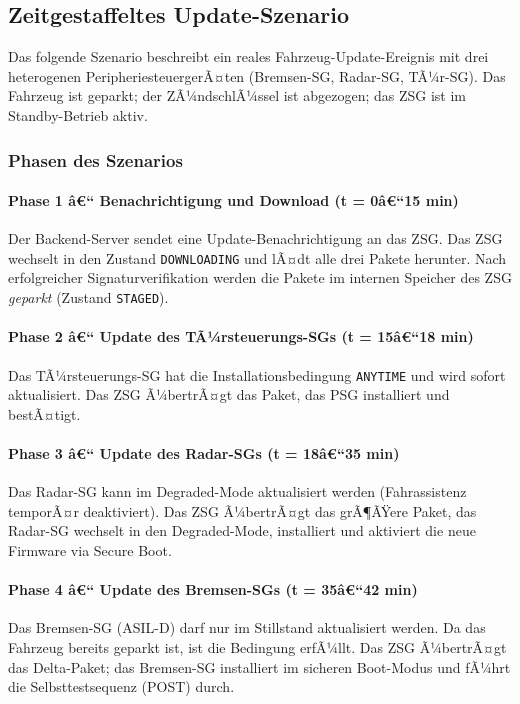 ﻿\documentclass[12pt,a4paper,twoside]{article}
\begin{document}
\subsection{Zeitgestaffeltes Update-Szenario}
\label{subsec:zeitgestaffelt}

Das folgende Szenario beschreibt ein reales Fahrzeug-Update-Ereignis mit
drei heterogenen PeripheriesteuergerÃ¤ten (Bremsen-SG, Radar-SG, TÃ¼r-SG).
Das Fahrzeug ist geparkt; der ZÃ¼ndschlÃ¼ssel ist abgezogen; das ZSG ist
im Standby-Betrieb aktiv.

\subsubsection{Phasen des Szenarios}

\paragraph{Phase 1 â€“ Benachrichtigung und Download (t = 0â€“15 min)}
Der Backend-Server sendet eine Update-Benachrichtigung an das ZSG.
Das ZSG wechselt in den Zustand \texttt{DOWNLOADING} und lÃ¤dt alle drei
Pakete herunter. Nach erfolgreicher Signaturverifikation werden die Pakete
im internen Speicher des ZSG \emph{geparkt} (Zustand \texttt{STAGED}).

\paragraph{Phase 2 â€“ Update des TÃ¼rsteuerungs-SGs (t = 15â€“18 min)}
Das TÃ¼rsteuerungs-SG hat die Installationsbedingung \texttt{ANYTIME}
und wird sofort aktualisiert. Das ZSG Ã¼bertrÃ¤gt das Paket, das PSG
installiert und bestÃ¤tigt.

\paragraph{Phase 3 â€“ Update des Radar-SGs (t = 18â€“35 min)}
Das Radar-SG kann im Degraded-Mode aktualisiert werden (Fahrassistenz
temporÃ¤r deaktiviert). Das ZSG Ã¼bertrÃ¤gt das grÃ¶ÃŸere Paket, das
Radar-SG wechselt in den Degraded-Mode, installiert und aktiviert die
neue Firmware via Secure Boot.

\paragraph{Phase 4 â€“ Update des Bremsen-SGs (t = 35â€“42 min)}
Das Bremsen-SG (ASIL-D) darf nur im Stillstand aktualisiert werden.
Da das Fahrzeug bereits geparkt ist, ist die Bedingung erfÃ¼llt. Das ZSG
Ã¼bertrÃ¤gt das Delta-Paket; das Bremsen-SG installiert im sicheren
Boot-Modus und fÃ¼hrt die Selbsttestsequenz (POST) durch.
\end{document}
